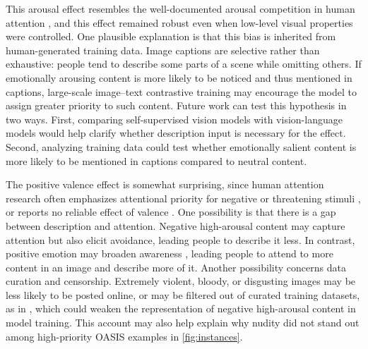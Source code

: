 \documentclass{article}
\begin{document}
This arousal effect resembles the well-documented arousal competition in human attention \citep{vogtAllocationSpatialAttention2008b, schimmackAttentionalInterferenceEffects2005a, hansenFindingFaceCrowd1988a, ohmanEmotionDrivesAttention2001}, and this effect remained robust even when low-level visual properties were controlled. One plausible explanation is that this bias is inherited from human-generated training data. Image captions are selective rather than exhaustive: people tend to describe some parts of a scene while omitting others. If emotionally arousing content is more likely to be noticed and thus mentioned in captions, large-scale image--text contrastive training may encourage the model to assign greater priority to such content. Future work can test this hypothesis in two ways. First, comparing self-supervised vision models with vision-language models would help clarify whether description input is necessary for the effect. Second, analyzing training data could test whether emotionally salient content is more likely to be mentioned in captions compared to neutral content.

The positive valence effect is somewhat surprising, since human attention research often emphasizes attentional priority for negative or threatening stimuli \citep{prattoAutomaticVigilanceAttentiongrabbing1991, hansenFindingFaceCrowd1988a, ohmanEmotionDrivesAttention2001}, or reports no reliable effect of valence \citep{schimmackAttentionalInterferenceEffects2005a, vogtAllocationSpatialAttention2008b}. One possibility is that there is a gap between description and attention. Negative high-arousal content may capture attention but also elicit avoidance, leading people to describe it less. In contrast, positive emotion may broaden awareness \citep{fredrickson2004broaden}, leading people to attend to more content in an image and describe more of it.  Another possibility concerns data curation and censorship. Extremely violent, bloody, or disgusting images may be less likely to be posted online, or may be filtered out of curated training datasets, as in \citep{radfordLearningTransferableVisual2021a}, which could weaken the representation of negative high-arousal content in model training. This account may also help explain why nudity did not stand out among high-priority OASIS examples in \cref{fig:instances}.
\end{document}
